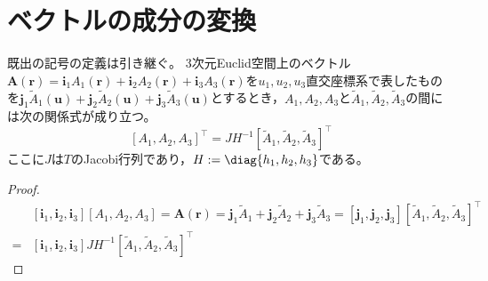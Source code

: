     \section{ベクトルの成分の変換}
        \label{ベクトルの成分の変換}
        \begin{shadebox}
            既出の記号の定義は引き継ぐ。
            3次元Euclid空間上のベクトル$\bm{A}(\bm{r}) = \bm{i}_1 A_1(\bm{r}) + \bm{i}_2 A_2(\bm{r}) + \bm{i}_3 A_3(\bm{r})$を$u_1,u_2,u_3$直交座標系で表したものを$\bm{j}_1 \tilde{A}_1(\bm{u}) + \bm{j}_2 \tilde{A}_2(\bm{u}) + \bm{j}_3 \tilde{A}_3(\bm{u})$とするとき，$A_1,A_2,A_3$と$\tilde{A}_1,\tilde{A}_2,\tilde{A}_3$の間には次の関係式が成り立つ。
            \[ [A_1,A_2,A_3]^\top = JH^{-1}[\tilde{A}_1,\tilde{A}_2,\tilde{A}_3]^\top \]
            ここに$J$は$T$のJacobi行列であり，$H := \diag{h_1,h_2,h_3}$である。
        \end{shadebox}
        \begin{proof}
            \begin{align*}
                \phantom{=} &[\bm{i}_1,\bm{i}_2,\bm{i}_3][A_1,A_2,A_3] = \bm{A}(\bm{r}) = \bm{j}_1 \tilde{A}_1 + \bm{j}_2 \tilde{A}_2 + \bm{j}_3 \tilde{A}_3 = [\bm{j}_1,\bm{j}_2,\bm{j}_3][\tilde{A}_1,\tilde{A}_2,\tilde{A}_3]^\top \\
                = &[\bm{i}_1,\bm{i}_2,\bm{i}_3]JH^{-1}[\tilde{A}_1,\tilde{A}_2,\tilde{A}_3]^\top
            \end{align*}
        \end{proof}
